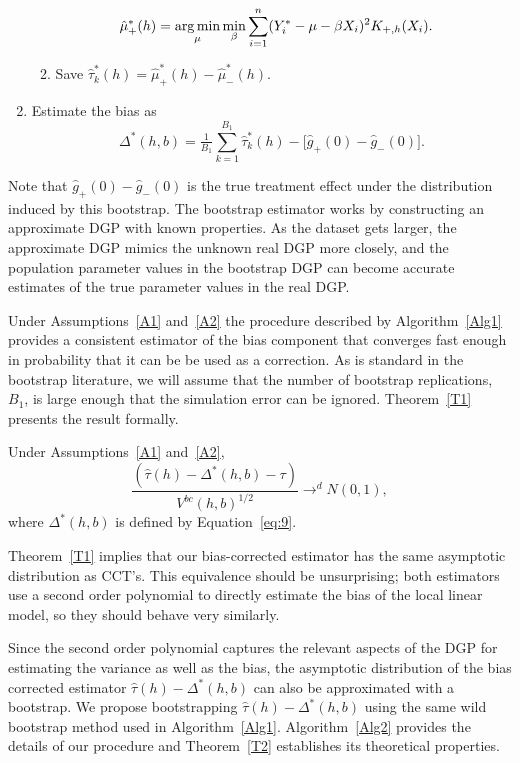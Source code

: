 \documentclass[12pt,fleqn]{article}
\begin{document}
\begin{algorithm}
\begin{enumerate}
\begin{enumerate}
\begin{align*}
        \hat\mu_+^*(h)
        &= \operatorname*{arg\,min}_{\mu} \min_{\beta} \sum_{i = 1}^n
          (Y_i^* - \mu - \beta X_i)^2 K_{+,h}(X_{i}).
      \end{align*}
    \item Save $\hat\tau^*_k(h) = \hat\mu_+^*(h) - \hat\mu_-^*(h)$.
    \end{enumerate}
  \item Estimate the bias as
    \begin{equation}
      \label{eq:9}
      \Delta^*(h,b) = \tfrac{1}{B_1} \sum_{k=1}^{B_1} \hat\tau^*_k(h) -
      \big[\hat g_+(0) - \hat g_-(0)\big].
    \end{equation}
  \end{enumerate}
\end{algorithm}
Note that $\hat g_+(0) - \hat g_-(0)$ is the true treatment effect under the
distribution induced by this bootstrap. The bootstrap estimator works by
constructing an approximate DGP with known properties. As the dataset gets
larger, the approximate DGP mimics the unknown real DGP more closely, and the
population parameter values in the bootstrap DGP can become accurate estimates
of the true parameter values in the real DGP.

Under Assumptions~\ref{A1} and~\ref{A2} the procedure described by
Algorithm~\ref{Alg1} provides a consistent estimator of the bias component that
converges fast enough in probability that it can be be used as a correction. As
is standard in the bootstrap literature, we will assume that the number of
bootstrap replications, $B_{1}$, is large enough that the simulation error can
be ignored. Theorem~\ref{T1} presents the result formally.

\begin{theorem}\label{T1}
  Under Assumptions~\ref{A1} and~\ref{A2},
\begin{equation}
  \label{eq:4}
  \frac{(\hat\tau(h) - \Delta^{*}(h,b) - \tau)}{ V^{bc}(h, b)^{1/2}}
  \to^{d} N(0,1),
\end{equation}
where $\Delta^*(h,b)$ is defined by Equation~\eqref{eq:9}.
\end{theorem}

Theorem~\ref{T1} implies that our bias-corrected
estimator has the same asymptotic distribution as CCT's. This equivalence should
be unsurprising; both estimators use a second order polynomial to directly estimate
the bias of the local linear model, so they should behave very similarly.

Since the second order polynomial captures the relevant aspects of the DGP for
estimating the variance as well as the bias, the asymptotic distribution of the
bias corrected estimator $\hat\tau(h) - \Delta^*(h,b)$ can also be approximated
with a bootstrap. We propose bootstrapping $\hat\tau(h) - \Delta^*(h,b)$ using
the same wild bootstrap method used in Algorithm~\ref{Alg1}. Algorithm~\ref{Alg2} provides the details of our procedure
and Theorem~\ref{T2} establishes its theoretical properties.
\end{document}
